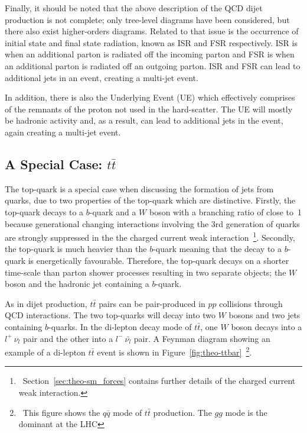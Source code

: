 Finally, it should be noted that the above description of the QCD dijet production is not complete;
only tree-level diagrams have been considered, but there also exist higher-orders diagrams.
Related to that issue is the occurrence of initial state and final state radiation, known as ISR and FSR respectively.
ISR is when an additional parton is radiated off the incoming parton and FSR is when an additional parton is radiated off an outgoing parton.
ISR and FSR can lead to additional jets in an event, creating a multi-jet event.

In addition, there is also the Underlying Event (UE) which effectively comprises of the remnants of the proton not used in the hard-scatter.
The UE will mostly be hadronic activity and, as a result, can lead to additional jets in the event, again creating a multi-jet event.

\subsection{A Special Case: $t\bar{t}$}
\label{sec:theo-ttbar}

The top-quark is a special case when discussing the formation of jets from quarks,
due to two properties of the top-quark which are distinctive.
Firstly, the top-quark decays to a $b$-quark and a $W$ boson with a branching ratio of close to~1
because generational changing interactions involving the 3rd generation of quarks
are strongly suppressed in the the charged current weak interaction~\footnote{\ Section~\ref{sec:theo-sm_forces} contains further details of the charged current weak interaction.}.
Secondly, the top-quark is much heavier than the $b$-quark
meaning that the decay to a $b$-quark is energetically favourable.
Therefore, the top-quark decays on a shorter time-scale than parton shower processes
resulting in two separate objects; the $W$ boson and the hadronic jet containing a $b$-quark.

As in dijet production, $t\bar{t}$ pairs can be pair-produced in $pp$ collisions through QCD interactions.
The two top-quarks will decay into two $W$ bosons and two jets containing $b$-quarks.
In the di-lepton decay mode of $t\bar{t}$, one $W$ boson decays into a $l^+~\nu_l$ pair and the other into a $l^{-}~\bar{\nu_l}$ pair.
A Feynman diagram showing an example of a di-lepton $t\bar{t}$ event is shown in
Figure~\ref{fig:theo-ttbar}~\footnote{\ This figure shows the $q\bar{q}$ mode of $t\bar{t}$ production. The $gg$ mode is the dominant at the LHC}.

